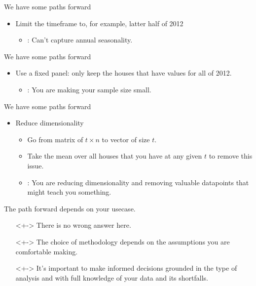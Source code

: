\documentclass{beamer}
\begin{document}
\begin{frame}{We have some paths forward}
  \begin{itemize}
    \item<+-> Limit the timeframe to, for example, latter half of 2012
    \begin{itemize}
      \item<+-> {\color{red}{Con}}: Can't capture annual seasonality.
    \end{itemize}
  \end{itemize}
\end{frame}

\begin{frame}{We have some paths forward}
  \begin{itemize}
    \item<+-> Use a fixed panel: only keep the houses that have values for all of 2012.
    \begin{itemize}
      \item<+-> {\color{red}{Con}}: You are making your sample size small.
    \end{itemize}
  \end{itemize}
\end{frame}

\begin{frame}{We have some paths forward}
  \begin{itemize}
    \item<+-> Reduce dimensionality
    \begin{itemize}
      \item<+-> Go from matrix of $t \times n$ to vector of size $t$.
      \item<+-> Take the mean over all houses that you have at any given $t$ to remove this issue.
      \item<+-> {\color{red}{Con}}: You are reducing dimensionality and removing valuable datapoints that might teach you something.
    \end{itemize}
  \end{itemize}
\end{frame}

\begin{frame}{The path forward depends on your usecase.}
  \begin{itemize}
    \item[]<+-> There is no wrong answer here. 
    \item[]<+-> The choice of methodology depends on the assumptions you are comfortable making.
    \item[]<+-> It's important to make informed decisions grounded in the type of analysis and with full knowledge of your data and its shortfalls.
  \end{itemize}
\end{frame}
\end{document}
